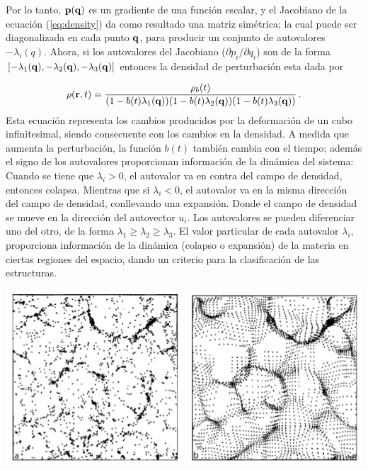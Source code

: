 Por lo tanto, ${\bf{p(q)}}$ es un gradiente de una función escalar, y el Jacobiano de la ecuación (\ref{eq:density}) da como resultado una matriz simétrica; la cual puede ser diagonalizada en cada punto $\bf{q}$, para producir un conjunto de autovalores $-\lambda_{i}(q)$. Ahora, si los autovalores del Jacobiano ($\partial p_{i}/\partial q_{i}$) son de la forma $[-\lambda_{1}({\bf{q}}),-\lambda_{2}({\bf{q}}),-\lambda_{3}({\bf{q}})]$ entonces la densidad de perturbación esta dada por 

\begin{align}
\rho({\bf{r}},t)=\frac{\rho_{b}(t)}{(1-b(t)\lambda_{1}({\bf{q}}))(1-b(t)\lambda_{2}({\bf{q}}))(1-b(t)\lambda_{3}({\bf{q}}))}\,.
\end{align}
%
Esta ecuación representa los cambios producidos por la deformación de un cubo infinitesimal, siendo consecuente con los cambios en la densidad. A medida que aumenta la perturbación, la función $b(t)$ también cambia con el tiempo; además el signo de los autovalores proporcionan información de la dinámica del sistema: Cuando se tiene que $\lambda_{i}>0$, el autovalor va en contra del campo de densidad, entonces colapsa. Mientras que si $\lambda_{i}<0$, el autovalor va en la misma dirección del campo de densidad, conllevando una expansión. Donde el campo de densidad se mueve en la dirección del autovector $u_{i}$. Los autovalores se pueden diferenciar uno del otro, de la forma $\lambda_{1}\geq \lambda_{2}\geq \lambda_{3}$. El valor particular de cada autovalor $\lambda_{i}$, proporciona información de la dinámica (colapso o expansión) de la materia en ciertas regiones del espacio, dando un criterio para la clasificación de las estructuras.  

\begin{center}
\includegraphics[scale=.5]{./figures/2_theoretical_framework/N-body_Vs_Zeldovich_appro.png}
\label{fig:diferencial_linea_esferico}
\end{center}






